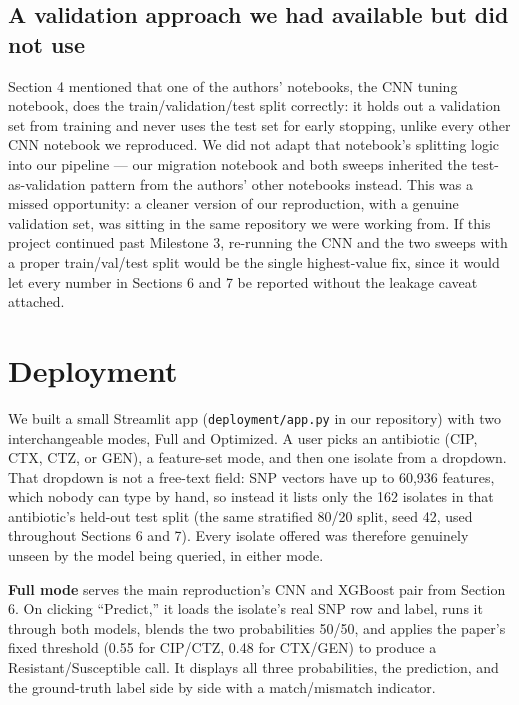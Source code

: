 \documentclass[11pt]{article}
\begin{document}
\subsection{A validation approach we had available but did not use}

Section 4 mentioned that one of the authors' notebooks, the CNN tuning notebook, does the train/validation/test split correctly: it holds out a validation set from training and never uses the test set for early stopping, unlike every other CNN notebook we reproduced. We did not adapt that notebook's splitting logic into our pipeline --- our migration notebook and both sweeps inherited the test-as-validation pattern from the authors' other notebooks instead. This was a missed opportunity: a cleaner version of our reproduction, with a genuine validation set, was sitting in the same repository we were working from. If this project continued past Milestone 3, re-running the CNN and the two sweeps with a proper train/val/test split would be the single highest-value fix, since it would let every number in Sections 6 and 7 be reported without the leakage caveat attached.

\section{Deployment}

We built a small Streamlit app (\texttt{deployment/app.py} in our repository) with two interchangeable modes, Full and Optimized. A user picks an antibiotic (CIP, CTX, CTZ, or GEN), a feature-set mode, and then one isolate from a dropdown. That dropdown is not a free-text field: SNP vectors have up to 60,936 features, which nobody can type by hand, so instead it lists only the 162 isolates in that antibiotic's held-out test split (the same stratified 80/20 split, seed 42, used throughout Sections 6 and 7). Every isolate offered was therefore genuinely unseen by the model being queried, in either mode.

\textbf{Full mode} serves the main reproduction's CNN and XGBoost pair from Section 6. On clicking ``Predict,'' it loads the isolate's real SNP row and label, runs it through both models, blends the two probabilities 50/50, and applies the paper's fixed threshold (0.55 for CIP/CTZ, 0.48 for CTX/GEN) to produce a Resistant/Susceptible call. It displays all three probabilities, the prediction, and the ground-truth label side by side with a match/mismatch indicator.
\end{document}
